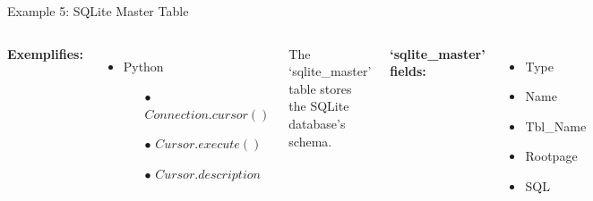 \documentclass{beamer}
\begin{document}
\begin{frame}{Example 5: SQLite Master Table}

\begin{columns}
 \scriptsize 

{\bf Exemplifies:}
\begin{itemize} \setlength\itemindent{-5pt}%
	\item Python
	\begin{itemize} \setlength\itemindent{-20pt} \scriptsize
		\item[$\bullet$] $Connection.cursor()$
		\item[$\bullet$] $Cursor.execute()$
		\item[$\bullet$] $Cursor.description$
	\end{itemize}
\end{itemize}

\vspace{12pt} The `sqlite\_master' table stores the SQLite database's schema.

\vspace{12pt} {\bf `sqlite\_master' fields:}
\begin{itemize} \setlength\itemindent{-5pt}%
\item Type
\item Name
\item Tbl\_Name
\item Rootpage
\item SQL
\end{itemize}



\end{columns}

\end{frame}
\end{document}
